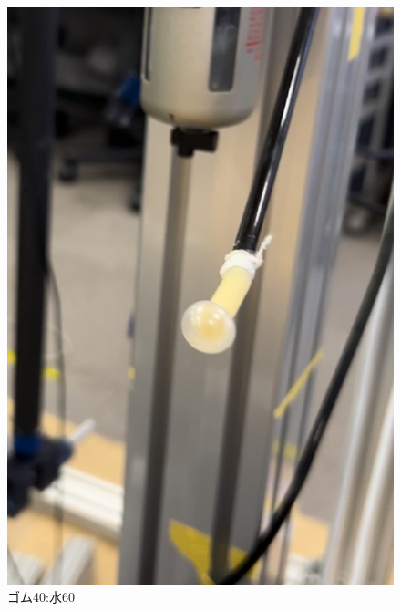 \begin{figure}[t]
\begin{minipage}{0.49\hsize}
      \includegraphics[scale=0.3]{pic/zu5.jpg}
      \caption{ゴム40:水60}
  \end{minipage} 
\end{figure}


\newpage
